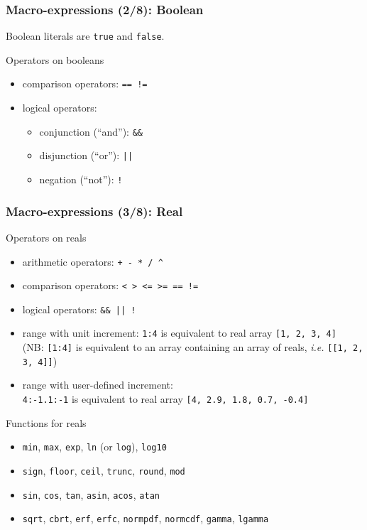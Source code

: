 \documentclass[aspectratio=169]{beamer}
\begin{document}
\begin{frame}[fragile=singleslide]
  \frametitle{Macro-expressions (2/8): Boolean}
  Boolean literals are \texttt{true} and \texttt{false}.
  \begin{block}{Operators on booleans}
    \begin{itemize}
    \item comparison operators: \texttt{== !=}
    \item logical operators:
      \begin{itemize}
      \item conjunction (“and”): \texttt{\&\&}
      \item disjunction (“or”): \texttt{||}
      \item negation (“not”): \texttt{!}
      \end{itemize}
    \end{itemize}
  \end{block}
\end{frame}

\begin{frame}[fragile=singleslide]
  \frametitle{Macro-expressions (3/8): Real}
  \begin{block}{Operators on reals}
    \begin{itemize}
    \item arithmetic operators: \texttt{+ - * / \^{}}
    \item comparison operators: \texttt{< > <= >= == !=}
    \item logical operators: \verb+&& || !+
    \item range with unit increment: \texttt{1:4} is equivalent to
      real array \texttt{[1, 2, 3, 4]} \\ (NB: \texttt{[1:4]} is equivalent to an
      array containing an array of reals, \textit{i.e.} \texttt{[[1, 2, 3, 4]]})
    \item range with user-defined increment: \\ \texttt{4:-1.1:-1} is equivalent to real array \texttt{[4, 2.9, 1.8, 0.7, -0.4]}
    \end{itemize}
  \end{block}

  \begin{block}{Functions for reals}
    \begin{itemize}
    \item \texttt{min}, \texttt{max}, \texttt{exp}, \texttt{ln} (or \texttt{log}), \texttt{log10}
    \item \texttt{sign}, \texttt{floor}, \texttt{ceil}, \texttt{trunc}, \texttt{round}, \texttt{mod}
    \item \texttt{sin}, \texttt{cos}, \texttt{tan}, \texttt{asin}, \texttt{acos}, \texttt{atan}
    \item \texttt{sqrt}, \texttt{cbrt}, \texttt{erf}, \texttt{erfc}, \texttt{normpdf}, \texttt{normcdf}, \texttt{gamma}, \texttt{lgamma}
    \end{itemize}
  \end{block}
\end{frame}
\end{document}
